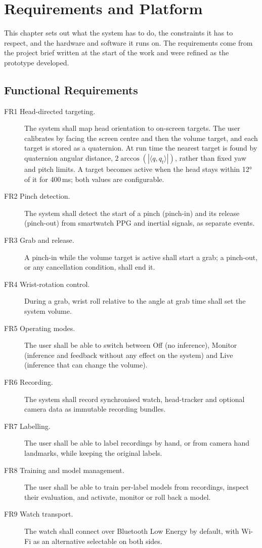 \chapter{Requirements and Platform}\label{ch:requirements}

This chapter sets out what the system has to do, the constraints it has to respect, and the hardware and software it runs on. The requirements come from the project brief written at the start of the work and were refined as the prototype developed.

\section{Functional Requirements}

\begin{description}
\item[FR1 Head-directed targeting.] The system shall map head orientation to on-screen targets. The user calibrates by facing the screen centre and then the volume target, and each target is stored as a quaternion. At run time the nearest target is found by quaternion angular distance, $2\arccos(|\langle q, q_t\rangle|)$, rather than fixed yaw and pitch limits. A target becomes active when the head stays within 12° of it for 400\,ms; both values are configurable.
\item[FR2 Pinch detection.] The system shall detect the start of a pinch (pinch-in) and its release (pinch-out) from smartwatch PPG and inertial signals, as separate events.
\item[FR3 Grab and release.] A pinch-in while the volume target is active shall start a grab; a pinch-out, or any cancellation condition, shall end it.
\item[FR4 Wrist-rotation control.] During a grab, wrist roll relative to the angle at grab time shall set the system volume.
\item[FR5 Operating modes.] The user shall be able to switch between Off (no inference), Monitor (inference and feedback without any effect on the system) and Live (inference that can change the volume).
\item[FR6 Recording.] The system shall record synchronised watch, head-tracker and optional camera data as immutable recording bundles.
\item[FR7 Labelling.] The user shall be able to label recordings by hand, or from camera hand landmarks, while keeping the original labels.
\item[FR8 Training and model management.] The user shall be able to train per-label models from recordings, inspect their evaluation, and activate, monitor or roll back a model.
\item[FR9 Watch transport.] The watch shall connect over Bluetooth Low Energy by default, with Wi-Fi as an alternative selectable on both sides.
\end{description}

